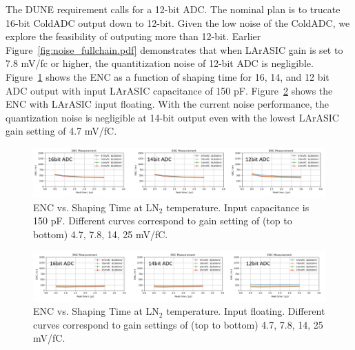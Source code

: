 The DUNE requirement calls for a 12-bit ADC. The nominal plan is to trucate 16-bit ColdADC output down to 
12-bit. Given the low noise of the ColdADC, we explore the feasibility of outputing more than 12-bit.
Earlier Figure~\ref{fig:noise_fullchain.pdf} demonstrates that when LArASIC gain is set to 7.8 mV/fc or higher, 
the quantitization noise of 12-bit ADC is negligible. Figure~\ref{fig:noise_quant150pf} 
shows the ENC as a function of shaping time for 16, 14, and 12 bit ADC output with input LArASIC capacitance
of 150 pF. Figure~\ref{fig:noise_quantfloat} shows the ENC with LArASIC input floating. With the 
current noise performance, the quantization noise is negligible at 14-bit output even with the lowest LArASIC gain setting of 4.7 mV/fC.
\begin{figure}[h!]
\centering
  \includegraphics[width=1.0\linewidth]{figures/noise_quant150pf.png}
  \caption{ENC vs. Shaping Time at LN$_2$ temperature. Input capacitance is 150 pF. Different curves 
correspond to gain setting of (top to bottom) 4.7, 7.8, 14, 25 mV/fC.}
  \label{fig:noise_quant150pf}
\end{figure}
\begin{figure}[h!]
\centering
  \includegraphics[width=1.0\linewidth]{figures/noise_quantfloat.png}
  \caption{ENC vs. Shaping Time at LN$_2$ temperature. Input floating. Different curves correspond to 
gain settings of (top to bottom) 4.7, 7.8, 14, 25 mV/fC.}
  \label{fig:noise_quantfloat}
\end{figure}



